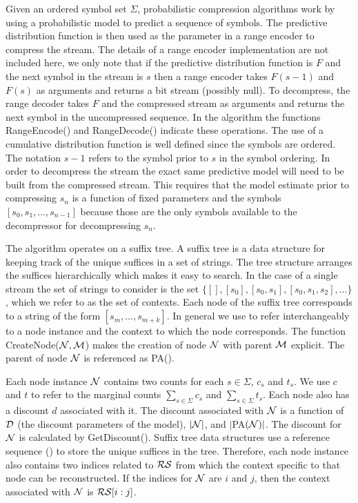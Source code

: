 Given an ordered symbol set $\Sigma$, probabilistic compression algorithms work by using a probabilistic model to predict a sequence of symbols.   The predictive distribution function is then used as the parameter in a range encoder to compress the stream. The details of a range encoder implementation are not included here, we only note that if the predictive distribution function is $F$ and the next symbol in the stream is $s$ then a range encoder takes $F(s-1)$ and $F(s)$ as arguments and returns a bit stream (possibly null). To decompress, the range decoder takes $F$ and the compressed stream as arguments and returns the next symbol in the uncompressed sequence. In the algorithm the functions RangeEncode() and RangeDecode() indicate these operations.  The use of a cumulative distribution function is well defined since the symbols are ordered.  The notation $s-1$ refers to the symbol prior to $s$ in the symbol ordering.  In order to decompress the stream the exact same predictive model will need to be built from the compressed stream.  This requires that the model estimate prior to compressing $s_n$ is a function of fixed parameters and the symbols $[s_0, s_1, \ldots, s_{n-1}]$ because those are the only symbols available to the decompressor for decompressing $s_n$.  

The algorithm operates on a suffix tree.  A suffix tree is a data structure for keeping track of the unique suffices in a set of strings.  The tree structure arranges the suffices hierarchically which makes it easy to search.  In the case of a single stream the set of strings to consider is the set $\{ [ ], [s_0], [s_0,s_1], [s_0, s_1,s_2], \ldots \}$, which we refer to as the set of contexts.   Each node of the suffix tree corresponds to a string of the form $[s_m, \ldots, s_{m + k}]$.  In general we use \N \space to refer interchangeably to a node instance and the context to which the node corresponds. The function CreateNode($\N, \M$) makes the creation of node $\N$ with parent $\M$ explicit. The parent of node $\N$ is referenced as PA(\N).

Each node instance $\N$ contains two counts for each $s \in \Sigma$, $c_s$ and $t_s$.  We use $c$ and $t$ to refer to the marginal counts $\sum_{s \in \Sigma} c_s$ and $\sum_{s \in \Sigma} t_s$.  Each node also has a discount $d$ associated with it.  The discount associated with $\N$ is a function of $\D$ (the discount parameters of the model), $|\N|$, and $|$PA$(\N)|$.  The discount for $\N$ is calculated by GetDiscount(\N). Suffix tree data structures use a reference sequence (\RS) to store the unique suffices in the tree.  Therefore, each node instance also contains two indices related to $\RS$ from which the context specific to that node can be reconstructed.  If the indices for $\N$ are $i$ and $j$, then the context associated with $\N$ is $\RS[i : j]$.

